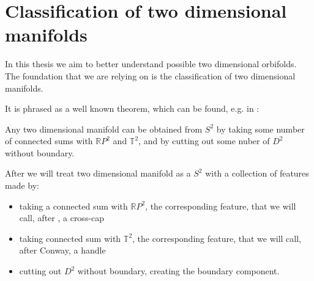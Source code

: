 

\section{Classification of two dimensional manifolds}\label{2 dim manifolds}
In this thesis we aim to better understand possible two dimensional orbifolds. 
The foundation that we are relying on is the classification of two dimensional manifolds. 

It is phrased as a well known theorem, which can be found, e.g. in \cite{Conway2016}:
\begin{theorem}
Any two dimensional manifold can be obtained from $S^2$ by taking some number of 
connected sums with $\mathbb{R}P^2$ and $\mathbb{T}^2$, and by cutting out 
some nuber of $D^2$ without boundary.
\end{theorem}

After \cite{Conway2016} we will treat two dimensional manifold as a $S^2$ with 
a collection of features
made by:
\begin{itemize}
\item taking a connected sum with $\mathbb{R}P^2$, the corresponding feature, that
we will call, after \cite{Conway2016}, a cross-cap
\item taking connected sum with $\mathbb{T}^2$, the corresponding feature, that we will call, 
after Conway, a handle
\item cutting out $D^2$ without boundary, creating the boundary component. 
\end{itemize}






